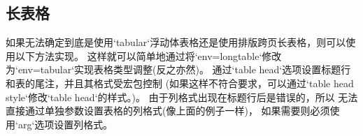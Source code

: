 \subsection{长表格}
\label{longtable}
如果无法确定到底是使用`tabular`浮动体表格还是使用排版跨页长表格，则可以使用以下方法实现。
这样就可以简单地通过将`env=longtable`修改为`env=tabular`实现表格类型调整(反之亦然)。
通过`table head`选项设置标题行和表的尾注，并且其格式受宏包控制
(如果这样不符合要求，可以通过`table head style`修改`table head`的样式。)。
由于列格式出现在标题行后是错误的，所以
无法直接通过单独参数设置表格的列格式(像上面的例子一样)，
如果需要则必须使用`arg`选项设置列格式。

